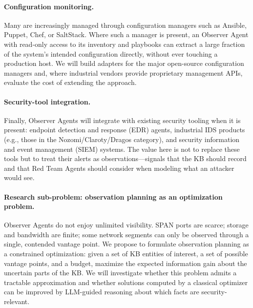 \paragraph{Configuration monitoring.}
Many \CPSs are increasingly managed through configuration managers
such as Ansible, Puppet, Chef, or SaltStack. Where such a manager is
present, an Observer Agent with read-only access to its inventory and
playbooks can extract a large fraction of the system's intended
configuration directly, without ever touching a production host. We
will build adapters for the major open-source configuration managers
and, where industrial vendors provide proprietary management APIs,
evaluate the cost of extending the approach.

\paragraph{Security-tool integration.}
Finally, Observer Agents will integrate with existing security tooling
when it is present: endpoint detection and response (EDR) agents,
industrial IDS products (e.g., those in the Nozomi/Claroty/Dragos
category), and security information and event management (SIEM)
systems. The value here is not to replace these tools but to treat
their alerts as observations---signals that the KB should record and
that Red Team Agents should consider when modeling what an attacker
would see.

\paragraph{Research sub-problem: observation planning as an optimization
problem.}
Observer Agents do not enjoy unlimited visibility. SPAN ports are
scarce; storage and bandwidth are finite; some network segments can
only be observed through a single, contended vantage point. We propose
to formulate observation planning as a constrained optimization: given
a set of KB entities of interest, a set of possible vantage points,
and a budget, maximize the expected information gain about the
uncertain parts of the KB. We will investigate whether this problem
admits a tractable approximation and whether solutions computed by a
classical optimizer can be improved by LLM-guided reasoning about
which facts are security-relevant.

